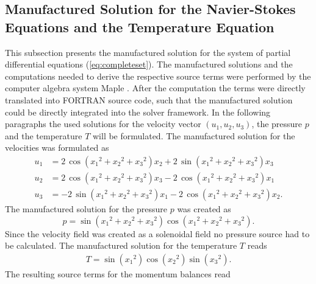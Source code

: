 \subsection{Manufactured Solution for the Navier-Stokes Equations and the Temperature Equation}
\label{sec:manufacturedsolution}

This subsection presents the manufactured solution for the system of partial differential equations (\ref{eq:completeset}). The manufactured solutions and the computations needed to derive the respective source terms were performed by the computer algebra system Maple \textregistered \cite{maple}. After the computation the terms were directly translated into FORTRAN source code, such that the manufactured solution could be directly integrated into the solver framework. In the following paragraphs the used solutions for the velocity vector \((u_1,u_2,u_3)\), the pressure \(p\) and the temperature \(T\) will be formulated. The manufactured solution for the velocities was formulated as
\begin{align*}
  u_1 &= 2\,\cos \left( {x_1}^{2}+{x_2}^{2}+{x_3}^{2} \right) x_2+2\,\sin \left( {x_1}^{2}+{x_2}^{2}+{x_3}^{2} \right) x_3 \\[1.0em]
  u_2 &= 2\,\cos \left( {x_1}^{2}+{x_2}^{2}+{x_3}^{2} \right) x_3-2\,\cos \left( {x_1}^{2 }+{x_2}^{2}+{x_3}^{2} \right) x_1 \\[1.0em]
  u_3 &= -2\,\sin \left( {x_1}^{2}+{x_2}^{2}+{x_3}^{2} \right) x_1-2\,\cos \left( {x_1}^{ 2}+{x_2}^{2}+{x_3}^{2} \right) x_2.
\end{align*}
The manufactured solution for the pressure \(p\) was created as
\begin{displaymath}
  p = \sin \left( {x_1}^{2}+{x_2}^{2}+{x_3}^{2} \right) \cos \left( {x_1}^{2}+ {x_2}^{2 }+{x_3}^{2} \right).
\end{displaymath}
Since the velocity field was created as a solenoidal field no pressure source had to be calculated. The manufactured solution for the temperature \(T\) reads
\begin{align*}
  T=\sin \left( {x_1}^{2} \right) \cos \left( {x_2}^{2} \right) \sin \left( {x_3 }^{2} \right).
\end{align*}
The resulting source terms for the momentum balances read
